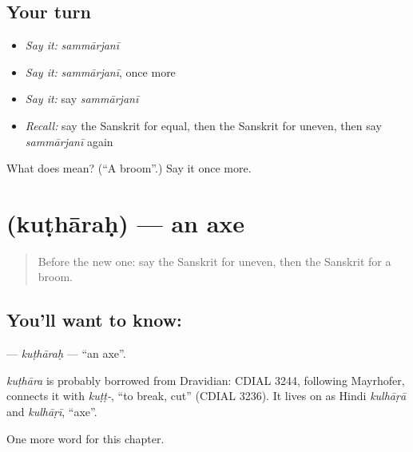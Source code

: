 \subsection*{Your turn}
\begin{itemize}
\raggedright
  \item \emph{Say it:} \emph{sammārjanī}
  \item \emph{Say it:} \emph{sammārjanī}, once more
  \item \emph{Say it:} say \emph{sammārjanī}
  \item \emph{Recall:} say the Sanskrit for equal, then the Sanskrit for uneven, then say \emph{sammārjanī} again
\end{itemize}

\begin{tcolorbox}[breakable,colback=teal!4,colframe=teal!35!black,title={Before you move on}]
What does  mean? (\textquotedblleft{}A broom\textquotedblright{}.) Say it once more.
\end{tcolorbox}
\section[\texorpdfstring{\sk{कुठारः} (kuṭhāraḥ)}{कुठारः (kuṭhāraḥ)}]{ (kuṭhāraḥ) — an axe}

\label{lesson:SA-C218-kutharah}



\begin{quote}
Before the new one: say the Sanskrit for uneven, then the Sanskrit for a broom.
\end{quote}

\subsection*{You'll want to know: }
\textbf{} — \emph{kuṭhāraḥ} — \textquotedblleft{}an axe\textquotedblright{}.

\begin{cousinweb}
\emph{kuṭhāra} is probably borrowed from Dravidian: CDIAL 3244, following Mayrhofer, connects it with \emph{kuṭṭ-}, \textquotedblleft{}to break, cut\textquotedblright{} (CDIAL 3236). It lives on as Hindi \emph{kulhāṛā} and \emph{kulhāṛī}, \textquotedblleft{}axe\textquotedblright{}.
\end{cousinweb}

\begin{grammarlens}[title={What you've built}]
One more word for this chapter.
\end{grammarlens}

